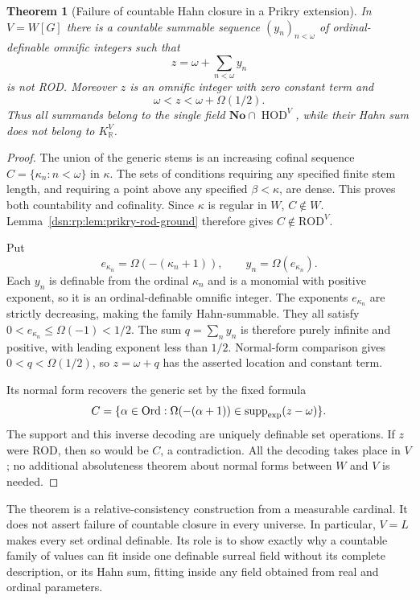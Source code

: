 \documentclass[11pt,a4paper]{article}
\numberwithin{equation}{section}
\newtheorem{theorem}{Theorem}[section]
\theoremstyle{definition}
\theoremstyle{remark}
\newcommand{\No}{\mathbf{No}}
\newcommand{\R}{\mathbb R}
\newcommand{\ROD}{\mathrm{ROD}}
\newcommand{\KR}{K_{\R}}
\begin{document}
\begin{theorem}[Failure of countable Hahn closure in a Prikry extension]
\label{dsn:rp:thm:prikry-sum}
In $V=W[G]$ there is a countable summable sequence $(y_n)_{n<\omega}$
of ordinal-definable omnific integers such that
\[
 z=\omega+\sum_{n<\omega}y_n
\]
is not ROD.  Moreover $z$ is an omnific integer with zero constant
term and
\[
 \omega<z<\omega+\Omega(1/2).
\]
Thus all summands belong to the single field
$\No\cap\operatorname{HOD}^{V}$, while their Hahn sum does
not belong to $\KR^{V}$.
\end{theorem}
\begin{proof}
The union of the generic stems is an increasing cofinal sequence
$C=\{\kappa_n:n<\omega\}$ in $\kappa$.  The sets of conditions
requiring any specified finite stem length, and requiring a point
above any specified $\beta<\kappa$, are dense.  This proves both
countability and cofinality.  Since $\kappa$ is regular in $W$,
$C\notin W$.  Lemma~\ref{dsn:rp:lem:prikry-rod-ground} therefore gives
$C\notin\ROD^{V}$.

Put
\[
 e_{\kappa_n}=\Omega(-(\kappa_n+1)),\qquad y_n=\Omega(e_{\kappa_n}).
\]
Each $y_n$ is definable from the ordinal $\kappa_n$ and is a monomial
with positive exponent, so it is an ordinal-definable omnific integer.
The exponents $e_{\kappa_n}$ are strictly decreasing, making the family
Hahn-summable.  They all satisfy
$0<e_{\kappa_n}\leq\Omega(-1)<1/2$.  The sum $q=\sum_n y_n$ is therefore
purely infinite and positive, with leading exponent less than $1/2$.
Normal-form comparison gives $0<q<\Omega(1/2)$, so $z=\omega+q$
has the asserted location and constant term.

Its normal form recovers the generic set by the fixed formula
\[
 C=\{\alpha\in\operatorname{Ord}:
       \Omega(-(\alpha+1))\in\operatorname{supp}_{\rm exp}(z-\omega)\}.
\]
The support and this inverse decoding are uniquely definable set
operations.  If $z$ were ROD, then so would be $C$, a contradiction.
All the decoding takes place in $V$; no additional absoluteness
theorem about normal forms between $W$ and $V$ is needed.
\end{proof}

The theorem is a relative-consistency construction from a measurable
cardinal.  It does not assert failure of countable closure in every
universe.  In particular, $V=L$ makes every set ordinal definable.
Its role is to show exactly why a countable family of values can fit
inside one definable surreal field without its complete description,
or its Hahn sum, fitting inside any field obtained from real and
ordinal parameters.
\end{document}
